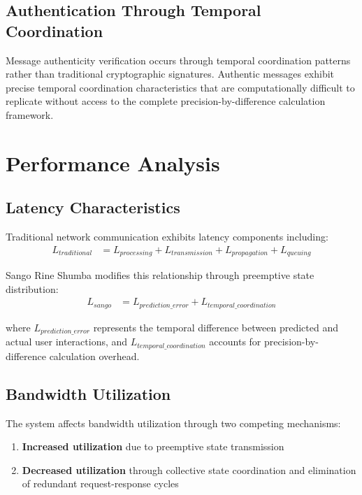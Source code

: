 \documentclass[12pt,a4paper]{article}
\begin{document}
\subsection{Authentication Through Temporal Coordination}

Message authenticity verification occurs through temporal coordination patterns rather than traditional cryptographic signatures. Authentic messages exhibit precise temporal coordination characteristics that are computationally difficult to replicate without access to the complete precision-by-difference calculation framework.

\section{Performance Analysis}

\subsection{Latency Characteristics}

Traditional network communication exhibits latency components including:
\begin{align}
L_{traditional} &= L_{processing} + L_{transmission} + L_{propagation} + L_{queuing}
\end{align}

Sango Rine Shumba modifies this relationship through preemptive state distribution:
\begin{align}
L_{sango} &= L_{prediction\_error} + L_{temporal\_coordination}
\end{align}

where $L_{prediction\_error}$ represents the temporal difference between predicted and actual user interactions, and $L_{temporal\_coordination}$ accounts for precision-by-difference calculation overhead.

\subsection{Bandwidth Utilization}

The system affects bandwidth utilization through two competing mechanisms:
\begin{enumerate}
\item \textbf{Increased utilization} due to preemptive state transmission
\item \textbf{Decreased utilization} through collective state coordination and elimination of redundant request-response cycles
\end{enumerate}
\end{document}
